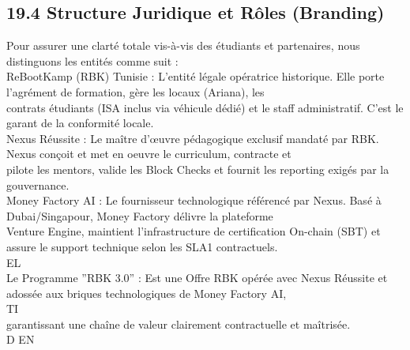 \documentclass[12pt,landscape,a4paper]{article}
\begin{document}
\subsection{19.4 Structure Juridique et Rôles (Branding)}
Pour assurer une clarté totale vis-à-vis des étudiants et partenaires, nous distinguons les entités comme suit :\\
\vspace{0.5em}
ReBootKamp (RBK) Tunisie : L’entité légale opératrice historique. Elle porte l’agrément de formation, gère les locaux (Ariana), les\\
contrats étudiants (ISA inclus via véhicule dédié) et le staff administratif. C’est le garant de la conformité locale.\\
\vspace{0.5em}
Nexus Réussite : Le maître d’œuvre pédagogique exclusif mandaté par RBK. Nexus conçoit et met en oeuvre le curriculum, contracte et\\
pilote les mentors, valide les Block Checks et fournit les reporting exigés par la gouvernance.\\
\vspace{0.5em}
Money Factory AI : Le fournisseur technologique référencé par Nexus. Basé à Dubai/Singapour, Money Factory délivre la plateforme\\
Venture Engine, maintient l’infrastructure de certification On-chain (SBT) et assure le support technique selon les SLA1 contractuels.\\
\vspace{0.5em}
\vspace{0.5em}
\vspace{0.5em}
\vspace{0.5em}
EL\\
Le Programme ”RBK 3.0” : Est une Offre RBK opérée avec Nexus Réussite et adossée aux briques technologiques de Money Factory AI,\\
\vspace{0.5em}
\vspace{0.5em}
\vspace{0.5em}
\vspace{0.5em}
TI\\
garantissant une chaîne de valeur clairement contractuelle et maîtrisée.\\
\vspace{0.5em}
\vspace{0.5em}
\vspace{0.5em}
\vspace{0.5em}
D     EN\\
\end{document}
